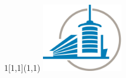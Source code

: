 \begin{titlepage}
\setlength{\TPHorizModule}{\paperwidth - (.5\paperwidth - .5\textwidth)}
\setlength{\TPVertModule}{\paperheight - (.5\paperheight - .5\textheight)}
\begin{textblock}{1}[1,1](1,1)
\includegraphics[width=100pt]{figures/logo-cropped}
\end{textblock}

\end{titlepage}

\cleardoublepage
{}
